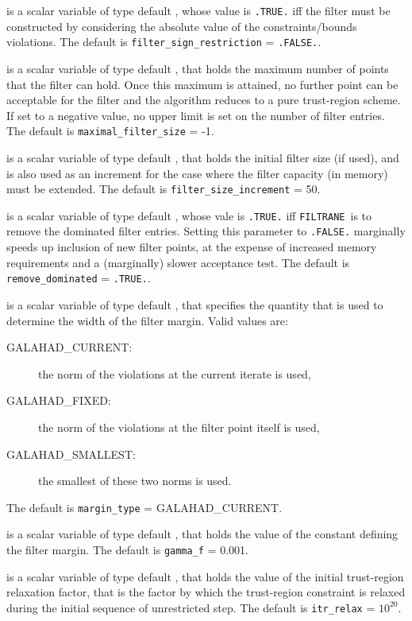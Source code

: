 \documentclass{galahad}
\newcommand{\packagename}{FILTRANE}
\newcommand{\sym}{\sf\small}
\newcommand{\filtrane}{{\tt \packagename}}
\begin{document}
\begin{description}
 is a scalar variable of type default \logical,
whose value is {\tt .TRUE.} iff the filter must be constructed by considering
the absolute value of the constraints/bounds violations.
The default is {\tt filter\_sign\_restriction} = {\tt .FALSE.}.

 is a scalar variable of type default \logical, that
holds the maximum number of points that the filter can hold. Once this maximum
is attained, no further point can be acceptable for the filter and the
algorithm reduces to a pure trust-region scheme.  If set to a negative value,
no upper limit is set on the number of filter entries.
The default is {\tt maximal\_filter\_size} = -1.

 is a scalar variable of type default \integer,
that holds the initial filter size (if used), and is also used as an increment
for the case where the filter capacity (in memory) must be extended.
The default is {\tt filter\_size\_increment} = 50.

 is a scalar variable of type default \logical, whose
vale is {\tt .TRUE.} iff \filtrane\ is to remove the dominated filter entries.
Setting this parameter to {\tt .FALSE.} marginally speeds up inclusion of new
filter points, at the expense of increased memory requirements and a
(marginally) slower acceptance test. 
The default is {\tt remove\_dominated} = {\tt .TRUE.}.

 is a scalar variable of type default \integer, that
specifies the quantity that is used to determine the width of the filter
margin. Valid values are:
\begin{description}
\item[\sym GALAHAD\_CURRENT:] the norm of the violations at the current
iterate is used,
\item[\sym GALAHAD\_FIXED:] the norm of the violations at the filter point
itself is used,
\item[\sym GALAHAD\_SMALLEST:] the smallest of these two norms is used.
\end{description}
The default is {\tt margin\_type} = {\sym GALAHAD\_CURRENT}.

 is a scalar variable of type default \realdp, that holds the
value of the constant defining the filter margin.
The default is {\tt gamma\_f} = 0.001.

 is a scalar variable of type default \realdp, that holds the
value of the initial trust-region relaxation factor, that is the factor by
which the trust-region constraint is relaxed during the initial sequence of
unrestricted step.
The default is {\tt itr\_relax} = $10^{20}$.


\end{description}
\end{document}
